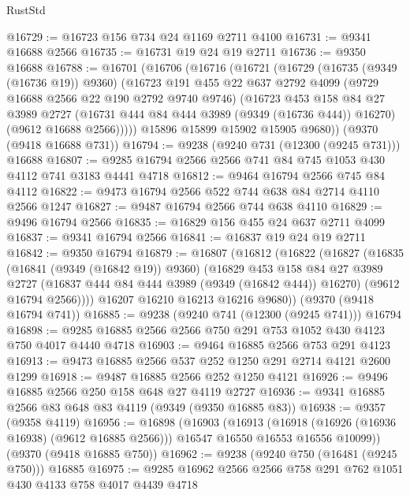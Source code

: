 \begin{lexlean}{RustStd}
\begin{coremodule}
{\begin{coremodule}
{{{{{{{{{{{{{{{{{{{{{{{{{{{{{{{{{{{{{{{@16729 := @16723 @156 @734 @24 @1169 @2711 @4100
@16731 := @9341 @16688 @2566
@16735 := @16731 @19 @24 @19 @2711
@16736 := @9350 @16688
@16788 := @16701
    (@16706
      (@16716
        (@16721
          (@16729
            (@16735 (@9349 (@16736 @19)) @9360)
            (@16723
              @191
              @455
              @22
              @637
              @2792
              @4099
              (@9729 @16688 @2566 @22 @190 @2792 @9740 @9746)
              (@16723
                @453
                @158
                @84
                @27
                @3989
                @2727
                (@16731 @444 @84 @444 @3989 (@9349 (@16736 @444)) @16270)
                (@9612 @16688 @2566)))))
        @15896
        @15899
        @15902
        @15905
        @9680))
    (@9370 (@9418 @16688 @731))
@16794 := @9238 (@9240 @731 (@12300 (@9245 @731))) @16688
@16807 := @9285 @16794 @2566 @2566 @741 @84 @745 @1053 @430 @4112 @741 @3183 @4441 @4718
@16812 := @9464 @16794 @2566 @745 @84 @4112
@16822 := @9473 @16794 @2566 @522 @744 @638 @84 @2714 @4110 @2566 @1247
@16827 := @9487 @16794 @2566 @744 @638 @4110
@16829 := @9496 @16794 @2566
@16835 := @16829 @156 @455 @24 @637 @2711 @4099
@16837 := @9341 @16794 @2566
@16841 := @16837 @19 @24 @19 @2711
@16842 := @9350 @16794
@16879 := @16807
    (@16812
      (@16822
        (@16827
          (@16835
            (@16841 (@9349 (@16842 @19)) @9360)
            (@16829
              @453
              @158
              @84
              @27
              @3989
              @2727
              (@16837 @444 @84 @444 @3989 (@9349 (@16842 @444)) @16270)
              (@9612 @16794 @2566))))
        @16207
        @16210
        @16213
        @16216
        @9680))
    (@9370 (@9418 @16794 @741))
@16885 := @9238 (@9240 @741 (@12300 (@9245 @741))) @16794
@16898 := @9285 @16885 @2566 @2566 @750 @291 @753 @1052 @430 @4123 @750 @4017 @4440 @4718
@16903 := @9464 @16885 @2566 @753 @291 @4123
@16913 := @9473 @16885 @2566 @537 @252 @1250 @291 @2714 @4121 @2600 @1299
@16918 := @9487 @16885 @2566 @252 @1250 @4121
@16926 := @9496 @16885 @2566 @250 @158 @648 @27 @4119 @2727
@16936 := @9341 @16885 @2566 @83 @648 @83 @4119 (@9349 (@9350 @16885 @83))
@16938 := @9357 (@9358 @4119)
@16956 := @16898
    (@16903
      (@16913
        (@16918 (@16926 (@16936 @16938) (@9612 @16885 @2566)))
        @16547
        @16550
        @16553
        @16556
        @10099))
    (@9370 (@9418 @16885 @750))
@16962 := @9238 (@9240 @750 (@16481 (@9245 @750))) @16885
@16975 := @9285 @16962 @2566 @2566 @758 @291 @762 @1051 @430 @4133 @758 @4017 @4439 @4718
}}}}}}}}}}}}}}}}}}}}}}}}}}}}}}}}}}}}}}}
\end{coremodule}}
\end{coremodule}
\end{lexlean}
